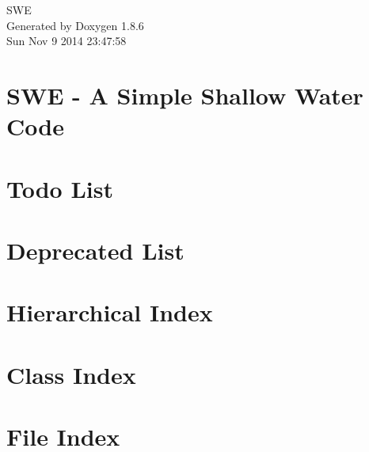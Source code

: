 \documentclass[twoside]{book}
\newcommand{\clearemptydoublepage}{%
  \newpage{\pagestyle{empty}\cleardoublepage}%
}
\begin{document}
\hypersetup{pageanchor=false}
\begin{titlepage}
\vspace*{7cm}
\begin{center}%
{\Large S\-W\-E }\\
\vspace*{1cm}
{\large Generated by Doxygen 1.8.6}\\
\vspace*{0.5cm}
{\small Sun Nov 9 2014 23:47:58}\\
\end{center}
\end{titlepage}
\clearemptydoublepage
\tableofcontents
\clearemptydoublepage
{}
\hypersetup{pageanchor=true}

\chapter{S\-W\-E -\/ A Simple Shallow Water Code}
\label{index}\hypertarget{index}{}
\chapter{Todo List}
\label{todo}
\hypertarget{todo}{}

\chapter{Deprecated List}
\label{deprecated}
\hypertarget{deprecated}{}

\chapter{Hierarchical Index}

\chapter{Class Index}

\chapter{File Index}

\end{document}
